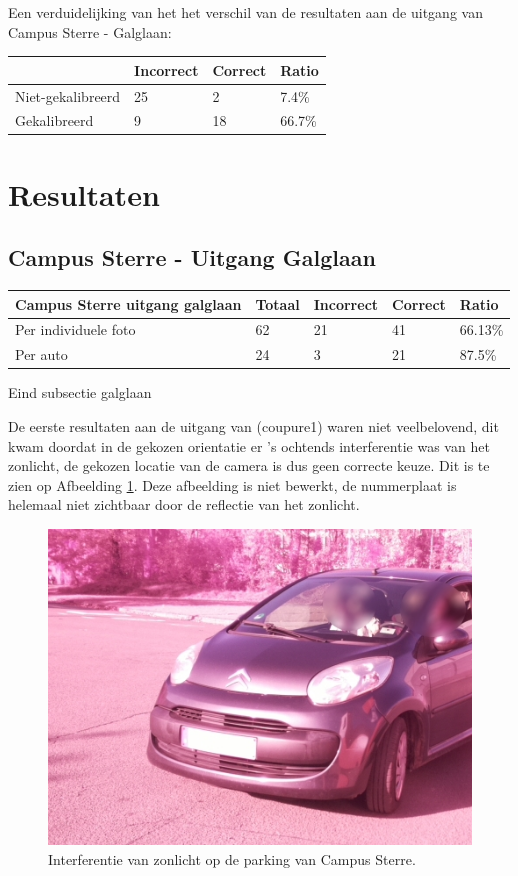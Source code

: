 Een verduidelijking van het het verschil van de resultaten aan de uitgang van Campus Sterre - Galglaan:
\begin{table}[h]
	\centering
	\begin{tabular}{l|l|l|l}
		 		& Incorrect & Correct & Ratio	\\ \hline
		Niet-gekalibreerd	& 25 & 2 & 7.4\%	\\
		Gekalibreerd	& 9 & 18 & 66.7\%\\
	\end{tabular}
\end{table}

\section{Resultaten}

\subsection{Campus Sterre - Uitgang Galglaan}

\begin{table}[h]
	\centering
	\begin{tabular}{l|l|l|l|l}
\textbf{Campus Sterre uitgang galglaan} & Totaal & Incorrect & Correct & Ratio	\\ \hline
Per individuele foto 	& 62 & 21	& 41	& 66.13\%\\
Per auto				& 24 & 3	& 21 	& 87.5\%\\
\end{tabular}
\end{table}



Eind subsectie galglaan

De eerste resultaten aan de uitgang van (coupure1) waren niet veelbelovend, dit kwam doordat in de gekozen orientatie er 's ochtends interferentie was van het zonlicht, de gekozen locatie van de camera is dus geen correcte keuze. Dit is te zien op Afbeelding \ref{SterreZonlicht}. Deze afbeelding is niet bewerkt, de nummerplaat is helemaal niet zichtbaar door de reflectie van het zonlicht.
\begin{figure}[h!]
	\centering
	\includegraphics[width=0.5\linewidth]{img/sterre2zon.jpg}
	\caption{Interferentie van zonlicht op de parking van Campus Sterre.}
	\label{SterreZonlicht}
\end{figure}

